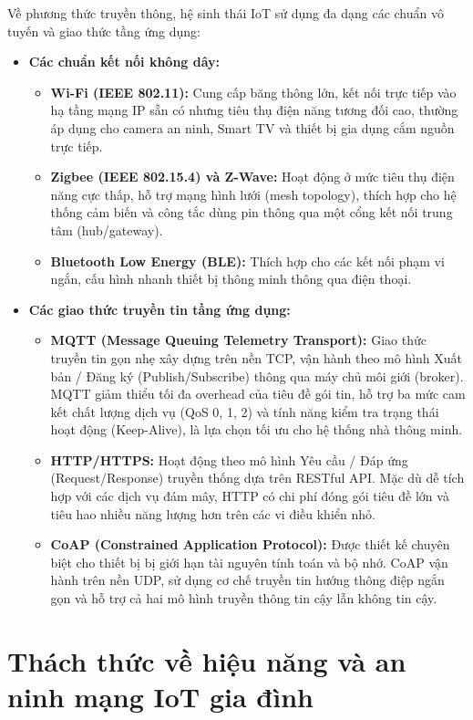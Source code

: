 Về phương thức truyền thông, hệ sinh thái IoT sử dụng đa dạng các chuẩn vô tuyến và giao thức tầng ứng dụng:
\begin{itemize}
    \item \textbf{Các chuẩn kết nối không dây:}
    \begin{itemize}
        \item \textbf{Wi-Fi (IEEE 802.11):} Cung cấp băng thông lớn, kết nối trực tiếp vào hạ tầng mạng IP sẵn có nhưng tiêu thụ điện năng tương đối cao, thường áp dụng cho camera an ninh, Smart TV và thiết bị gia dụng cắm nguồn trực tiếp.
        \item \textbf{Zigbee (IEEE 802.15.4) và Z-Wave:} Hoạt động ở mức tiêu thụ điện năng cực thấp, hỗ trợ mạng hình lưới (mesh topology), thích hợp cho hệ thống cảm biến và công tắc dùng pin thông qua một cổng kết nối trung tâm (hub/gateway).
        \item \textbf{Bluetooth Low Energy (BLE):} Thích hợp cho các kết nối phạm vi ngắn, cấu hình nhanh thiết bị thông minh thông qua điện thoại.
    \end{itemize}
    \item \textbf{Các giao thức truyền tin tầng ứng dụng:}
    \begin{itemize}
        \item \textbf{MQTT (Message Queuing Telemetry Transport):} Giao thức truyền tin gọn nhẹ xây dựng trên nền TCP, vận hành theo mô hình Xuất bản / Đăng ký (Publish/Subscribe) thông qua máy chủ môi giới (broker). MQTT giảm thiểu tối đa overhead của tiêu đề gói tin, hỗ trợ ba mức cam kết chất lượng dịch vụ (QoS 0, 1, 2) và tính năng kiểm tra trạng thái hoạt động (Keep-Alive), là lựa chọn tối ưu cho hệ thống nhà thông minh.
        \item \textbf{HTTP/HTTPS:} Hoạt động theo mô hình Yêu cầu / Đáp ứng (Request/Response) truyền thống dựa trên RESTful API. Mặc dù dễ tích hợp với các dịch vụ đám mây, HTTP có chi phí đóng gói tiêu đề lớn và tiêu hao nhiều năng lượng hơn trên các vi điều khiển nhỏ.
        \item \textbf{CoAP (Constrained Application Protocol):} Được thiết kế chuyên biệt cho thiết bị bị giới hạn tài nguyên tính toán và bộ nhớ. CoAP vận hành trên nền UDP, sử dụng cơ chế truyền tin hướng thông điệp ngắn gọn và hỗ trợ cả hai mô hình truyền thông tin cậy lẫn không tin cậy.
    \end{itemize}
\end{itemize}

\section{Thách thức về hiệu năng và an ninh mạng IoT gia đình}
\label{sec:thach-thuc-hieu-nang-an-ninh}

